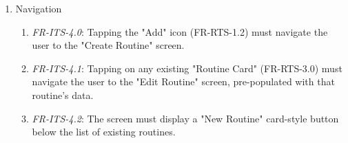 \documentclass[conference]{IEEEtran}
\begin{document}
\begin{enumerate}
\begin{enumerate}
                                    \begin{enumerate}
                                        \item \textit{FR-RTS-3.0}: Each Routine Card must display the user-defined name of the routine (e.g., "My Routine").
                                        \item \textit{FR-RTS-3.1}: The card must contain a visual summary of the routine's logic.
                                        \item \textit{FR-RTS-3.2}: The visual summary must display a chronological list of triggers (clock icons) aligned vertically.
                                        \item \textit{FR-RTS-3.3}: The visual summary must display a corresponding list of device actions (e.g., Air Purifier, Thermostat) to the right of the triggers.
                                        \item \textit{FR-RTS-3.4}: A vertical connector line must visually link the triggers and actions, with nodes indicating each time/action pair.
                                        \item \textit{FR-RTS-3.5}: Device icons in the summary must visually represent their target state:
                                        \begin{enumerate}
                                            \item On/Active: Icon is illuminated (e.g., glowing, in color).
                                            \item Off/Inactive: Icon is dim (e.g., greyed out).
                                        \end{enumerate}
                                    \end{enumerate} 
                                \item Navigation
                                    \begin{enumerate}
                                        \item \textit{FR-ITS-4.0}: Tapping the "Add" icon (FR-RTS-1.2) must navigate the user to the "Create Routine" screen.
                                        \item \textit{FR-ITS-4.1}: Tapping on any existing "Routine Card" (FR-RTS-3.0) must navigate the user to the "Edit Routine" screen, pre-populated with that routine's data.
                                        \item \textit{FR-ITS-4.2}: The screen must display a "New Routine" card-style button below the list of existing routines.

\end{enumerate}
\end{enumerate}
\end{enumerate}
\end{document}
